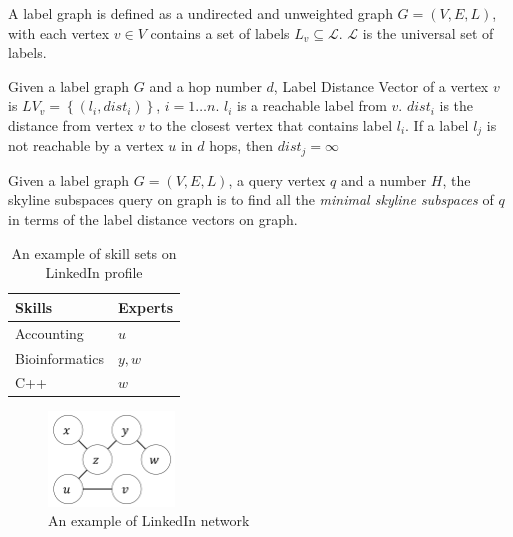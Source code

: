 \begin{definition}
A label graph is defined as a undirected and unweighted graph $G = (V, E, L)$, with each vertex $v \in V$ contains a set of labels $L_v \subseteq \mathcal{L}$. $\mathcal{L}$ is the universal set of labels.
\end{definition}

\begin{definition}
Given a label graph $G$ and a hop number $d$, Label Distance Vector of a vertex $v$ is $LV_v=\left\{\left(l_i, dist_i\right)\right\}$, $i = 1 \ldots n$. $l_i$ is a reachable label from $v$. $dist_i$ is the distance from vertex $v$ to the closest vertex that contains label $l_i$. If a label $l_j$ is not reachable by a vertex $u$ in $d$ hops, then $dist_j = \infty$
\end{definition}

\begin{definition}
Given a label graph $G = (V, E, L)$, a query vertex $q$ and a number $H$, the skyline subspaces query on graph is to find all the \emph{minimal skyline subspaces} of $q$ in terms of the label distance vectors on graph.
\end{definition}

\begin{table}[h]
    \centering
    \begin{tabular}{|l|l|}
    \hline
    Skills         & Experts \\ \hline
    Accounting     & $u$     \\ \hline
    Bioinformatics & $y, w$  \\ \hline
    C++            & $w$     \\ \hline
    \end{tabular}
    \caption{\label{tab:skill_sets}An example of skill sets on LinkedIn profile}
\end{table}
    
\begin{figure}[h]
    \centering
    \includegraphics[width=0.3\textwidth]{figs/graph_example}
    \caption{An example of LinkedIn network}
    \label{fig:graph}
\end{figure}

